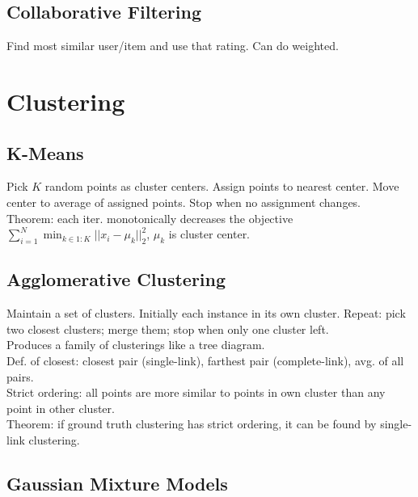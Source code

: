 \subsection*{Collaborative Filtering}

Find most similar user/item and use that rating. Can do weighted.

\section{Clustering}

\subsection*{K-Means}

Pick $K$ random points as cluster centers. Assign points to nearest center. Move center to average of assigned points. Stop when no assignment changes.\\
Theorem: each iter. monotonically decreases the objective $\sum_{i=1}^N \min_{k\in1:K}||x_i - \mu_k||_2^2$, $\mu_k$ is cluster center.

\subsection*{Agglomerative Clustering}

Maintain a set of clusters. Initially each instance in its own cluster. Repeat: pick two closest clusters; merge them; stop when only one cluster left.\\
Produces a family of clusterings like a tree diagram.\\
Def. of closest: closest pair (single-link), farthest pair (complete-link), avg. of all pairs.\\
Strict ordering: all points are more similar to points in own cluster than any point in other cluster.\\
Theorem: if ground truth clustering has strict ordering, it can be found by single-link clustering.

\subsection*{Gaussian Mixture Models}

